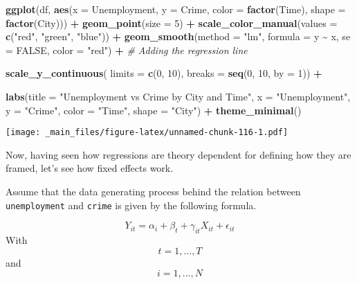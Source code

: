 \documentclass[
]{book}
\newenvironment{Shaded}{\begin{snugshade}}{\end{snugshade}}
\newcommand{\AttributeTok}[1]{\textcolor[rgb]{0.13,0.29,0.53}{#1}}
\newcommand{\CommentTok}[1]{\textcolor[rgb]{0.56,0.35,0.01}{\textit{#1}}}
\newcommand{\ConstantTok}[1]{\textcolor[rgb]{0.56,0.35,0.01}{#1}}
\newcommand{\DecValTok}[1]{\textcolor[rgb]{0.00,0.00,0.81}{#1}}
\newcommand{\FunctionTok}[1]{\textcolor[rgb]{0.13,0.29,0.53}{\textbf{#1}}}
\newcommand{\NormalTok}[1]{#1}
\newcommand{\SpecialCharTok}[1]{\textcolor[rgb]{0.81,0.36,0.00}{\textbf{#1}}}
\newcommand{\StringTok}[1]{\textcolor[rgb]{0.31,0.60,0.02}{#1}}
\begin{document}
\begin{Shaded}
\begin{Highlighting}[]
\FunctionTok{ggplot}\NormalTok{(df, }\FunctionTok{aes}\NormalTok{(}\AttributeTok{x =}\NormalTok{ Unemployment, }\AttributeTok{y =}\NormalTok{ Crime, }\AttributeTok{color =} \FunctionTok{factor}\NormalTok{(Time), }\AttributeTok{shape =} \FunctionTok{factor}\NormalTok{(City))) }\SpecialCharTok{+}
  \FunctionTok{geom\_point}\NormalTok{(}\AttributeTok{size =} \DecValTok{5}\NormalTok{) }\SpecialCharTok{+}
  \FunctionTok{scale\_color\_manual}\NormalTok{(}\AttributeTok{values =} \FunctionTok{c}\NormalTok{(}\StringTok{"red"}\NormalTok{, }\StringTok{"green"}\NormalTok{, }\StringTok{"blue"}\NormalTok{)) }\SpecialCharTok{+}
  \FunctionTok{geom\_smooth}\NormalTok{(}\AttributeTok{method =} \StringTok{"lm"}\NormalTok{, }\AttributeTok{formula =}\NormalTok{ y }\SpecialCharTok{\textasciitilde{}}\NormalTok{ x, }\AttributeTok{se =} \ConstantTok{FALSE}\NormalTok{, }\AttributeTok{color =} \StringTok{"red"}\NormalTok{) }\SpecialCharTok{+}  \CommentTok{\# Adding the regression line}

  \FunctionTok{scale\_y\_continuous}\NormalTok{(}
  \AttributeTok{limits =} \FunctionTok{c}\NormalTok{(}\DecValTok{0}\NormalTok{, }\DecValTok{10}\NormalTok{),}
  \AttributeTok{breaks =} \FunctionTok{seq}\NormalTok{(}\DecValTok{0}\NormalTok{, }\DecValTok{10}\NormalTok{, }\AttributeTok{by =} \DecValTok{1}\NormalTok{)) }\SpecialCharTok{+}
  
  \FunctionTok{labs}\NormalTok{(}\AttributeTok{title =} \StringTok{"Unemployment vs Crime by City and Time"}\NormalTok{,}
       \AttributeTok{x =} \StringTok{"Unemployment"}\NormalTok{,}
       \AttributeTok{y =} \StringTok{"Crime"}\NormalTok{,}
       \AttributeTok{color =} \StringTok{"Time"}\NormalTok{,}
       \AttributeTok{shape =} \StringTok{"City"}\NormalTok{) }\SpecialCharTok{+}
  \FunctionTok{theme\_minimal}\NormalTok{()}
\end{Highlighting}
\end{Shaded}

\texttt{[image: \_main\_files/figure-latex/unnamed-chunk-116-1.pdf]}

Now, having seen how regressions are theory dependent for defining how they are framed, let's see how fixed effects work.

Assume that the data generating process behind the relation between \texttt{unemployment} and \texttt{crime} is given by the following formula.

\[Y_{it}=\alpha_{i}+\beta_{t}+\gamma_{it}X_{it}+\epsilon_{it}\]
With \[t=1, ..., T\]
and
\[i=1, ..., N\]
\end{document}
